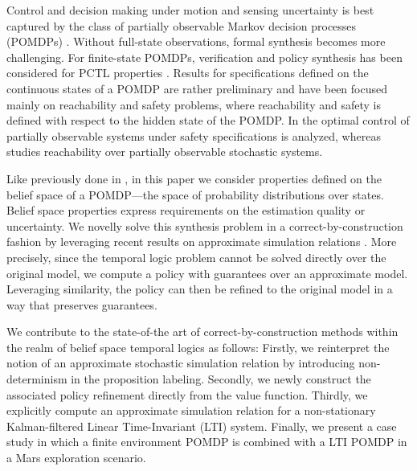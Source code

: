 \documentclass{ifacconf}
\begin{document}
Control and decision making under motion and sensing uncertainty is best captured by the class of partially observable Markov decision processes (POMDPs) \citep{Kaelbling98,Smallwood73}. Without full-state observations, formal synthesis becomes more challenging. For finite-state POMDPs, verification and policy synthesis has been considered for PCTL properties \citep{Norman2017, Chatterjee2014}. Results for specifications defined on the continuous states of a POMDP are rather preliminary and have been focused mainly on reachability and safety problems, where reachability and safety is defined with respect to the hidden state of the POMDP. In \citep{ding2013optimal} the optimal control of partially observable systems under safety specifications is analyzed, whereas \citep{LESSER20141989} studies reachability over partially observable stochastic systems.

Like previously done in  \citep{Vasile2016,JonesDTL2013}, in this paper we consider properties defined on the belief space of a POMDP---the space of probability distributions over states. Belief space properties express requirements on the estimation quality or uncertainty. We novelly solve this synthesis problem in a  correct-by-construction fashion by leveraging recent results on  approximate simulation relations \citep{haesaert2017verification, tech_report_TACAS}.
More precisely, since the temporal logic problem cannot be solved directly over the original model, we compute a policy with guarantees over an approximate model. Leveraging similarity, the policy can then be refined to the original model in a way that preserves guarantees.

We contribute to the state-of-the art of correct-by-construction methods within the realm of belief space temporal logics as follows: Firstly, we reinterpret the notion of an approximate stochastic simulation relation by introducing non-determinism in the proposition labeling. Secondly, we newly construct the associated policy refinement directly from the value function. Thirdly, we explicitly compute an approximate simulation relation for a non-stationary Kalman-filtered Linear Time-Invariant (LTI) system. Finally, we present a case study in which a finite environment POMDP is combined with a LTI POMDP in a Mars exploration scenario.

\end{document}
